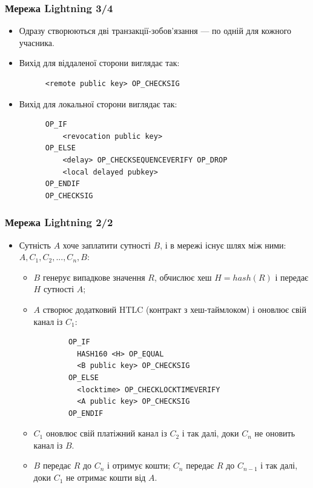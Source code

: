 \documentclass{beamer}
\begin{document}
\begin{frame}[fragile]
  \frametitle{Мережа Lightning 3/4}
  \begin{itemize}
  \item Одразу створюються дві транзакції-зобов'язання — по одній для кожного
    учасника.
  \item Вихід для віддаленої сторони виглядає так:
    \begin{verbatim}
      <remote public key> OP_CHECKSIG
    \end{verbatim}
  \item Вихід для локальної сторони виглядає так:
    \begin{verbatim}
      OP_IF
          <revocation public key>
      OP_ELSE
          <delay> OP_CHECKSEQUENCEVERIFY OP_DROP
          <local delayed pubkey>
      OP_ENDIF
      OP_CHECKSIG          
    \end{verbatim}
  \end{itemize}
\end{frame}

\begin{frame}[fragile]
  \frametitle{Мережа Lightning 2/2}
  \begin{itemize}
  \item Сутність $A$ хоче заплатити сутності $B$, і в мережі існує шлях між ними: 
    $A, C_1, C_2, ..., C_n, B$:
    \begin{itemize}
    \item $B$ генерує випадкове значення $R$, обчислює хеш $H = hash(R)$ і 
      передає $H$ сутності $A$;
    \item $A$ створює додатковий HTLC (контракт з хеш-таймлоком) і оновлює 
      свій канал із $C_1$:
      \begin{verbatim}
        OP_IF
          HASH160 <H> OP_EQUAL
          <B public key> OP_CHECKSIG
        OP_ELSE
          <locktime> OP_CHECKLOCKTIMEVERIFY
          <A public key> OP_CHECKSIG
        OP_ENDIF
      \end{verbatim}
    \item $C_1$ оновлює свій платіжний канал із $C_2$ і так далі, доки $C_n$ не 
      оновить канал із $B$.
    \item $B$ передає $R$ до $C_n$ і отримує кошти; $C_n$ передає $R$ до
      $C_{n-1}$ і так далі, доки $C_1$ не отримає кошти від $A$.
    \end{itemize}
  \end{itemize}
\end{frame}
\end{document}
